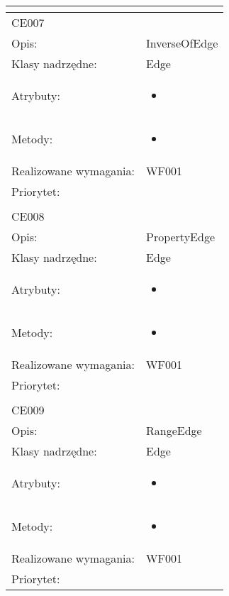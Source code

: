 \documentclass[a4paper,10pt]{article}
\begin{document}
\begin{center}
\begin{tabular}{|m{3cm}|m{9cm}|}
\multicolumn{2}{c}{} \\
 \hline

CE007 &  \\ \hline
Opis: & InverseOfEdge    \\ \hline
Klasy nadrzędne: & Edge    \\ \hline
Atrybuty: & \begin{itemize}
 \item 
\end{itemize}
 \\ \hline
Metody: & \begin{itemize}
 \item 
\end{itemize}
  \\ \hline
Realizowane wymagania: & WF001 \\ \hline
Priorytet: &  \\ \hline

\multicolumn{2}{c}{} \\
 \hline

CE008 &  \\ \hline
Opis: & PropertyEdge    \\ \hline
Klasy nadrzędne: & Edge    \\ \hline
Atrybuty: & \begin{itemize}
 \item 
\end{itemize}
 \\ \hline
Metody: & \begin{itemize}
 \item 
\end{itemize}
  \\ \hline
Realizowane wymagania: & WF001 \\ \hline
Priorytet: &  \\ \hline

\multicolumn{2}{c}{} \\
 \hline

CE009 &  \\ \hline
Opis: & RangeEdge    \\ \hline
Klasy nadrzędne: & Edge    \\ \hline
Atrybuty: & \begin{itemize}
 \item 
\end{itemize}
 \\ \hline
Metody: & \begin{itemize}
 \item 
\end{itemize}
  \\ \hline
Realizowane wymagania: & WF001 \\ \hline
Priorytet: &  \\ \hline


\end{tabular}
\end{center}
\end{document}
